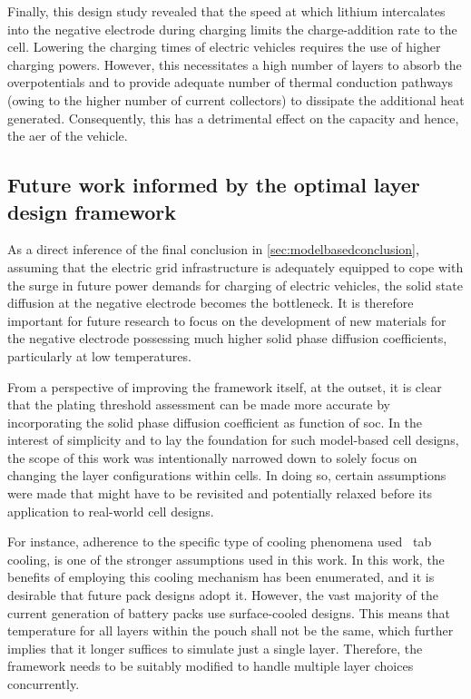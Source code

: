Finally, this design study revealed that the speed at which lithium intercalates
into the negative  electrode during charging limits the  charge-addition rate to
the cell. Lowering  the charging times of electric vehicles  requires the use of
higher charging  powers. However, this necessitates  a high number of  layers to
absorb the overpotentials  and to provide adequate number  of thermal conduction
pathways (owing  to the higher  number of  current collectors) to  dissipate the
additional heat  generated. Consequently, this  has a detrimental effect  on the
capacity and hence, the \gls{aer} of the vehicle.

\subsection{Future work informed by  the optimal layer design framework}

As     a     direct     inference     of     the     final     conclusion     in
\cref{sec:modelbasedconclusion}, assuming that  the electric grid infrastructure
is  adequately equipped  to cope  with  the surge  in future  power demands  for
charging  of  electric vehicles,  the  solid  state  diffusion at  the  negative
electrode becomes the bottleneck. It  is therefore important for future research
to  focus  on the  development  of  new  materials  for the  negative  electrode
possessing much higher  solid phase diffusion coefficients,  particularly at low
temperatures.

From a perspective of improving the framework itself, at the outset, it is clear
that the plating threshold assessment can be made more accurate by incorporating
the solid phase diffusion coefficient as  function of \gls{soc}. In the interest
of simplicity and  to lay the foundation for such  model-based cell designs, the
scope of this  work was intentionally narrowed down to  solely focus on changing
the layer  configurations within  cells. In doing  so, certain  assumptions were
made  that  might have  to  be  revisited  and  potentially relaxed  before  its
application to real-world cell designs.

For instance, adherence  to the specific type of cooling  phenomena used \ie~tab
cooling, is one of the stronger assumptions used in this work. In this work, the
benefits of  employing this  cooling mechanism  has been  enumerated, and  it is
desirable that future  pack designs adopt it. However, the  vast majority of the
current generation of battery packs  use surface-cooled designs. This means that
temperature for all layers within the pouch shall not be the same, which further
implies that it longer suffices to  simulate just a single layer. Therefore, the
framework  needs  to be  suitably  modified  to  handle multiple  layer  choices
concurrently.

